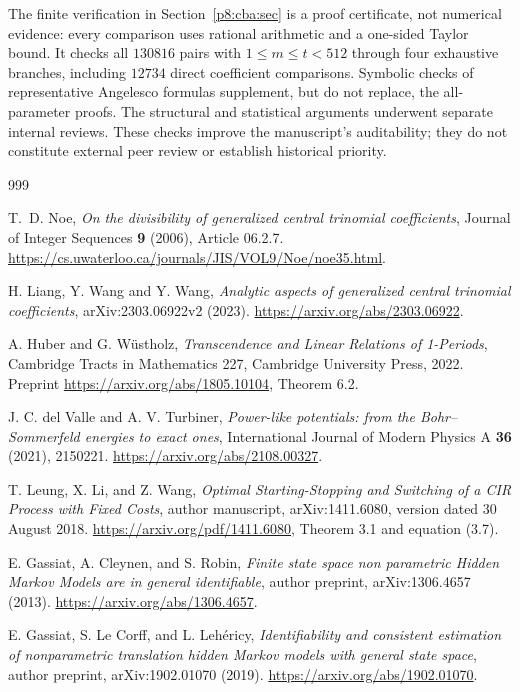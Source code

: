 \documentclass[11pt,a4paper]{article}
\theoremstyle{definition}
\theoremstyle{remark}
\numberwithin{equation}{section}
\begin{document}
The finite verification in Section~\ref{p8:cba:sec} is a proof certificate,
not numerical evidence: every comparison uses rational arithmetic and a
one-sided Taylor bound. It checks all $130816$ pairs with $1\le m\le
t<512$ through four exhaustive branches, including $12734$ direct
coefficient comparisons. Symbolic checks of representative Angelesco
formulas supplement, but do not replace, the all-parameter proofs.
The structural and statistical arguments underwent separate internal
reviews. These checks improve the manuscript's auditability; they do not
constitute external peer review or establish historical priority.

\clearpage
{}
{}
\begin{thebibliography}{999}
\raggedright
{}
T.~D. Noe, \emph{On the divisibility of generalized central trinomial coefficients},
Journal of Integer Sequences \textbf{9} (2006), Article 06.2.7.
\url{https://cs.uwaterloo.ca/journals/JIS/VOL9/Noe/noe35.html}.

H. Liang, Y. Wang and Y. Wang,
\emph{Analytic aspects of generalized central trinomial coefficients},
arXiv:2303.06922v2 (2023).
\url{https://arxiv.org/abs/2303.06922}.

A. Huber and G. W\"ustholz,
\emph{Transcendence and Linear Relations of 1-Periods},
Cambridge Tracts in Mathematics 227, Cambridge University Press, 2022.
Preprint \url{https://arxiv.org/abs/1805.10104}, Theorem 6.2.

J. C. del Valle and A. V. Turbiner,
\emph{Power-like potentials: from the Bohr--Sommerfeld energies to exact ones},
International Journal of Modern Physics A \textbf{36} (2021), 2150221.
\url{https://arxiv.org/abs/2108.00327}.

T. Leung, X. Li, and Z. Wang,
\emph{Optimal Starting-Stopping and Switching of a CIR Process with Fixed Costs},
author manuscript, arXiv:1411.6080, version dated 30 August 2018.
\url{https://arxiv.org/pdf/1411.6080}, Theorem 3.1 and equation (3.7).

E. Gassiat, A. Cleynen, and S. Robin,
\emph{Finite state space non parametric Hidden Markov Models are in general identifiable},
author preprint, arXiv:1306.4657 (2013).
\url{https://arxiv.org/abs/1306.4657}.

E. Gassiat, S. Le Corff, and L. Leh\'ericy,
\emph{Identifiability and consistent estimation of nonparametric translation hidden Markov models with general state space},
author preprint, arXiv:1902.01070 (2019).
\url{https://arxiv.org/abs/1902.01070}.


\end{thebibliography}
\end{document}
